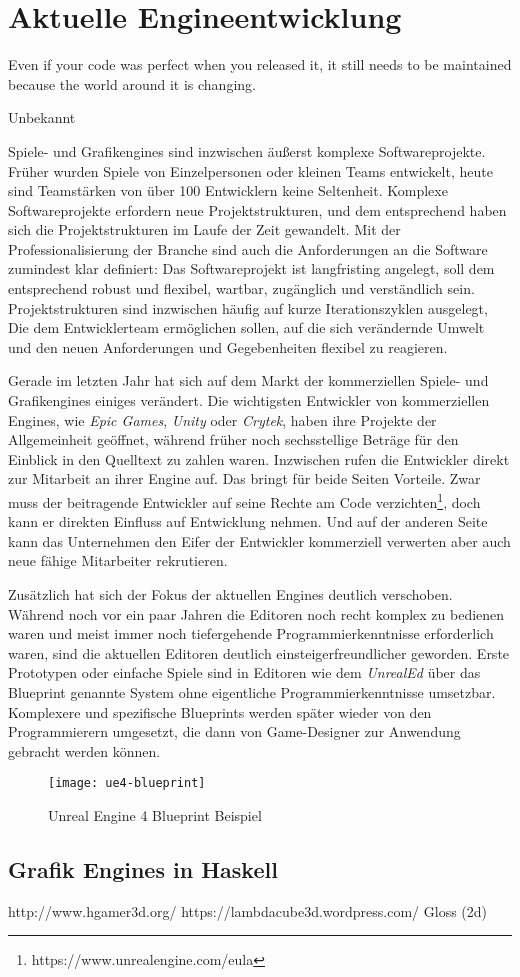 \chapter{Aktuelle Engineentwicklung}
\label{chap:engine-uebersicht}

\epigraph{Even if your code was perfect when you released it, it still needs to be maintained because the world around it is changing.}{Unbekannt}

Spiele- und Grafikengines sind inzwischen äußerst komplexe Softwareprojekte. Früher wurden Spiele von Einzelpersonen oder kleinen Teams entwickelt, heute sind Teamstärken von über 100 Entwicklern keine Seltenheit. Komplexe Softwareprojekte erfordern neue Projektstrukturen, und dem entsprechend haben sich die Projektstrukturen im Laufe der Zeit gewandelt. Mit der Professionalisierung der Branche sind auch die Anforderungen an die Software zumindest klar definiert: Das Softwareprojekt ist langfristing angelegt, soll dem entsprechend robust und flexibel, wartbar, zugänglich und verständlich sein. Projektstrukturen sind inzwischen häufig auf kurze Iterationszyklen ausgelegt, Die dem Entwicklerteam ermöglichen sollen, auf die sich verändernde Umwelt und den neuen Anforderungen und Gegebenheiten flexibel zu reagieren.

Gerade im letzten Jahr hat sich auf dem Markt der kommerziellen Spiele- und Grafikengines einiges verändert. Die wichtigsten Entwickler von kommerziellen Engines, wie \textit{Epic Games}, \textit{Unity} oder \textit{Crytek}, haben ihre Projekte der Allgemeinheit geöffnet, während früher noch sechsstellige Beträge für den Einblick in den Quelltext zu zahlen waren. Inzwischen rufen die Entwickler direkt zur Mitarbeit an ihrer Engine auf. Das bringt für beide Seiten Vorteile. Zwar muss der beitragende Entwickler auf seine Rechte am Code verzichten\footnote{https://www.unrealengine.com/eula}, doch kann er direkten Einfluss auf Entwicklung nehmen. Und auf der anderen Seite kann das Unternehmen den Eifer der Entwickler kommerziell verwerten aber auch neue fähige Mitarbeiter rekrutieren.

Zusätzlich hat sich der Fokus der aktuellen Engines deutlich verschoben. Während noch vor ein paar Jahren die Editoren noch recht komplex zu bedienen waren und meist immer noch tiefergehende Programmierkenntnisse erforderlich waren, sind die aktuellen Editoren deutlich einsteigerfreundlicher geworden. Erste Prototypen oder einfache Spiele sind in Editoren wie dem \textit{UnrealEd} über das Blueprint genannte System ohne eigentliche Programmierkenntnisse umsetzbar. Komplexere und spezifische Blueprints werden später wieder von den Programmierern umgesetzt, die dann von Game-Designer zur Anwendung gebracht werden können.

\begin{figure}
\centering
\texttt{[image: ue4-blueprint]}
\caption{Unreal Engine 4 Blueprint Beispiel}
\end{figure}

\section{Grafik Engines in Haskell}
http://www.hgamer3d.org/
https://lambdacube3d.wordpress.com/
Gloss (2d)
